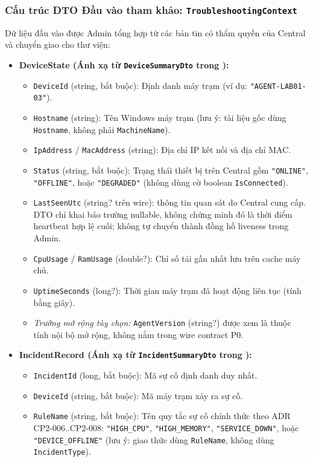 \documentclass[12pt,a4paper]{article}
\begin{document}
\subsubsection{Cấu trúc DTO Đầu vào tham khảo: \texttt{TroubleshootingContext}}
Dữ liệu đầu vào được Admin tổng hợp từ các bản tin có thẩm quyền của Central và chuyển giao cho thư viện:
\begin{itemize}
  \item \textbf{DeviceState (Ánh xạ từ \texttt{DeviceSummaryDto} trong ):}
    \begin{itemize}
      \item \texttt{DeviceId} (string, bắt buộc): Định danh máy trạm (ví dụ: \texttt{"AGENT-LAB01-03"}).
      \item \texttt{Hostname} (string): Tên Windows máy trạm (lưu ý: tài liệu gốc dùng \texttt{Hostname}, không phải \texttt{MachineName}).
      \item \texttt{IpAddress} / \texttt{MacAddress} (string): Địa chỉ IP kết nối và địa chỉ MAC.
      \item \texttt{Status} (string, bắt buộc): Trạng thái thiết bị trên Central gồm \texttt{"ONLINE"}, \texttt{"OFFLINE"}, hoặc \texttt{"DEGRADED"} (không dùng cờ boolean \texttt{IsConnected}).
      \item \texttt{LastSeenUtc} (string? trên wire): thông tin quan sát do Central cung cấp. DTO chỉ khai báo trường nullable, không chứng minh đó là thời điểm heartbeat hợp lệ cuối; không tự chuyển thành đồng hồ liveness trong Admin.
      \item \texttt{CpuUsage} / \texttt{RamUsage} (double?): Chỉ số tải gần nhất lưu trên cache máy chủ.
      \item \texttt{UptimeSeconds} (long?): Thời gian máy trạm đã hoạt động liên tục (tính bằng giây).
      \item \textit{Trường mở rộng tùy chọn:} \texttt{AgentVersion} (string?) được xem là thuộc tính nội bộ mở rộng, không nằm trong wire contract P0.
    \end{itemize}
  \item \textbf{IncidentRecord (Ánh xạ từ \texttt{IncidentSummaryDto} trong ):}
    \begin{itemize}
      \item \texttt{IncidentId} (long, bắt buộc): Mã sự cố định danh duy nhất.
      \item \texttt{DeviceId} (string, bắt buộc): Mã máy trạm xảy ra sự cố.
      \item \texttt{RuleName} (string, bắt buộc): Tên quy tắc sự cố chính thức theo ADR CP2-006..CP2-008: \texttt{"HIGH\_CPU"}, \texttt{"HIGH\_MEMORY"}, \texttt{"SERVICE\_DOWN"}, hoặc \texttt{"DEVICE\_OFFLINE"} (lưu ý: giao thức dùng \texttt{RuleName}, không dùng \texttt{IncidentType}).

\end{itemize}
\end{itemize}
\end{document}
